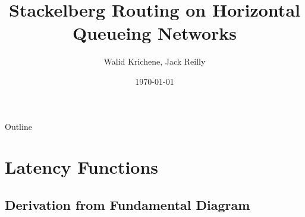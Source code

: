 \documentclass[english, smaller]{beamer}
\theoremstyle{plain}
\theoremstyle{definition}
\theoremstyle{plain}
\theoremstyle{plain}
\begin{document}
\title{Stackelberg Routing on Horizontal Queueing Networks}
\author{Walid Krichene, Jack Reilly}
\date{\today}


\begin{frame}
\titlepage
\end{frame}

\begin{frame}{Outline}
\tableofcontents
\end{frame}


\section{Latency Functions}

\subsection{Derivation from Fundamental Diagram}
\end{document}
